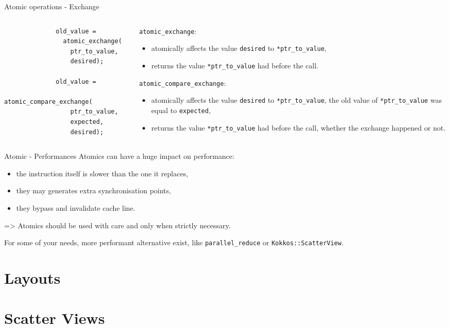 \documentclass[
    aspectratio=169,
    handout,
]{beamer}
\begin{document}
\begin{frame}[fragile]{Atomic operations - Exchange}
    \begin{columns}
        \begin{column}{0.4\linewidth}
            \begin{verbatim}
              old_value =
                atomic_exchange(
                  ptr_to_value,
                  desired);

              old_value =
                atomic_compare_exchange(
                  ptr_to_value,
                  expected,
                  desired);
            \end{verbatim}
        \end{column}
        \begin{column}{0.6\linewidth}
          \texttt{atomic\_exchange}:
          \begin{itemize}
            \item atomically affects the value \texttt{desired} to \texttt{*ptr\_to\_value},
            \item returns the value \texttt{*ptr\_to\_value} had before the call.
          \end{itemize}
          \texttt{atomic\_compare\_exchange}:
          \begin{itemize}
            \item atomically affects the value \texttt{desired} to \texttt{*ptr\_to\_value},  the old value of \texttt{*ptr\_to\_value} was equal to \texttt{expected},
            \item returns the value \texttt{*ptr\_to\_value} had before the call, whether the exchange happened or not.
          \end{itemize}
        \end{column}
    \end{columns}
\end{frame}

\begin{frame}[fragile]{Atomic - Performances}
  Atomics can have a huge impact on performance: 
  \begin{itemize}
    \item the instruction itself is slower than the one it replaces,
    \item they may generates extra synchronisation points,
    \item they bypass and invalidate cache line.
  \end{itemize}

  => Atomics should be used with care and only when strictly necessary.\linebreak

  For some of your needs, more performant alternative exist, like \texttt{parallel\_reduce} or \texttt{Kokkos::ScatterView}.
\end{frame}


\section{Layouts}


\section{Scatter Views}
\end{document}

